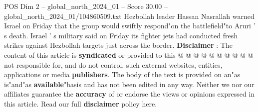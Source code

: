 \begin{textsample}{POS Dim 2 – global\_north\_2024\_01 – Score 30.00 – global\_north\_2024\_01/104860509.txt}
Hezbollah leader Hassan Nasrallah warned Israel on Friday that the group would swiftly respond"on the battlefield"to Aruri ' s death.
Israel ' s military said on Friday its fighter jets had conducted fresh strikes against Hezbollah targets just across the border. \textbf{Disclaimer} : The content of this article is \textbf{syndicated} or provided to this @ @ @ @ @ @ @ @ @ @ not responsible for, and do not control, such external websites, entities, applications or media \textbf{publishers}.
The body of the text is provided on an"as is"and"as \textbf{available}"basis and has not been edited in any way.
Neither we nor our affiliates guarantee the \textbf{accuracy} of or endorse the views or opinions expressed in this article.
Read our full \textbf{disclaimer} policy here.

\end{textsample}
